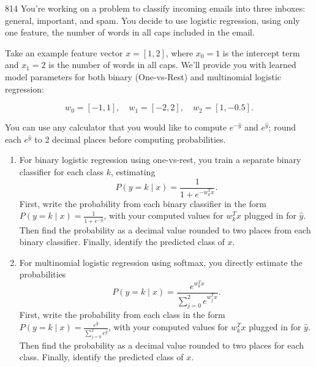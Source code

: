 \documentclass[11pt]{article}
\begin{document}
\begin{studentanswer}[24]
\end{studentanswer}


\begin{problem}{8}{14}
You’re working on a problem to classify incoming emails into three inboxes: general, important, and spam. You decide to use logistic regression, using only one feature, the number of words in all caps included in the email.

Take an example feature vector $x = [1, 2]$, where $x_0 = 1$ is the intercept term and $x_1 = 2$ is the number of words in all caps. We’ll provide you with learned model parameters for both binary (One-vs-Rest) and multinomial logistic regression:

\[
w_0 = [-1, 1], \quad w_1 = [-2, 2], \quad w_2 = [1, -0.5].
\]

You can use any calculator that you would like to compute $e^{-\hat{y}}$ and $e^{\hat{y}}$; round each $e^{\hat{y}}$ to 2 decimal places before computing probabilities.

\begin{enumerate}[label=(\alph*)]
    \item For binary logistic regression using one-vs-rest, you train a separate binary classifier for each class $k$, estimating 
    \[
    P(y=k \mid x) = \frac{1}{1 + e^{-w_k^T x}}.
    \]
    First, write the probability from each binary classifier in the form $P(y=k \mid x) = \frac{1}{1 + e^{-\hat{y}}}$, with your computed values for $w_k^T x$ plugged in for $\hat{y}$. Then find the probability as a decimal value rounded to two places from each binary classifier. Finally, identify the predicted class of $x$.
    \item For multinomial logistic regression using softmax, you directly estimate the probabilities
    \[
    P(y=k \mid x) = \frac{e^{w_k^T x}}{\sum_{j=0}^2 e^{w_j^T x}}.
    \]
    First, write the probability from each class in the form $P(y=k \mid x) = \frac{e^{\hat{y}}}{\sum_{j=0}^2 e^{\hat{y}}}$, with your computed values for $w_k^T x$ plugged in for $\hat{y}$. Then find the probability as a decimal value rounded to two places for each class. Finally, identify the predicted class of $x$.
\end{enumerate}
\end{problem}

\begin{studentanswer}[24]
\end{studentanswer}
\end{document}
